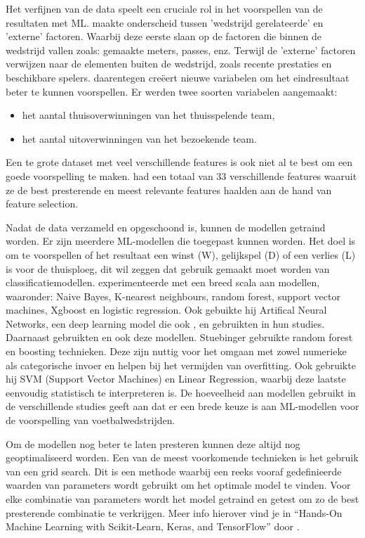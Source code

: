 Het verfijnen van de data speelt een cruciale rol in het voorspellen van de resultaten met ML. \textcite{Bunker2019} maakte onderscheid tussen 'wedstrijd gerelateerde' en 'externe' factoren. Waarbij deze eerste slaan op de factoren die binnen de wedstrijd vallen zoals: gemaakte meters, passes, enz. Terwijl de 'externe' factoren verwijzen naar de elementen buiten de wedstrijd, zoals recente prestaties en beschikbare spelers.
\textcite{Rodrigues2022} daarentegen creëert nieuwe variabelen om het eindresultaat beter te kunnen voorspellen. Er werden twee soorten variabelen aangemaakt:
\begin{itemize}
  \item het aantal thuisoverwinningen van het thuisspelende team,
  \item het aantal uitoverwinningen van het bezoekende team.
\end{itemize}
Een te grote dataset met veel verschillende features is ook niet al te best om een goede voorspelling te maken. \textcite{Baboota2019} had een totaal van 33 verschillende features waaruit ze de best presterende en meest relevante features haalden aan de hand van feature selection.

Nadat de data verzameld en opgeschoond is, kunnen de modellen getraind worden. Er zijn meerdere ML-modellen die toegepast kunnen worden. Het doel is om te voorspellen of het resultaat een winst (W), gelijkspel (D) of een verlies (L) is voor de thuisploeg, dit wil zeggen dat gebruik gemaakt moet worden van classificatiemodellen.
\textcite{Rodrigues2022} experimenteerde met een breed scala aan modellen, waaronder: Naive Bayes, K-nearest neighbours, random forest, support vector machines, Xgboost en logistic regression. Ook gebuikte hij Artifical Neural Networks, een deep learning model die ook \textcite{Bunker2019}, \textcite{Carloni2021} en \textcite{Azeman2020} gebruikten in hun studies. 
Daarnaast gebruikten \textcite{Stuebinger2019} en \textcite{KevinAndrews2021} ook deze modellen. Stuebinger gebruikte random forest en boosting technieken. Deze zijn nuttig voor het omgaan met zowel numerieke als categorische invoer en helpen bij het vermijden van overfitting. Ook gebruikte hij SVM (Support Vector Machines) en Linear Regression, waarbij deze laatste eenvoudig statistisch te interpreteren is.
De hoeveelheid aan modellen gebruikt in de verschillende studies geeft aan dat er een brede keuze is aan ML-modellen voor de voorspelling van voetbalwedstrijden.

Om de modellen nog beter te laten presteren kunnen deze altijd nog geoptimaliseerd worden. Een van de meest voorkomende technieken is het gebruik van een grid search. Dit is een methode waarbij een reeks vooraf gedefinieerde waarden van parameters wordt gebruikt om het optimale model te vinden. Voor elke combinatie van parameters wordt het model getraind en getest om zo de best presterende combinatie te verkrijgen. Meer info hierover vind je in “Hands-On Machine Learning with Scikit-Learn, Keras, and TensorFlow” door \autocite{Geron2019}.

